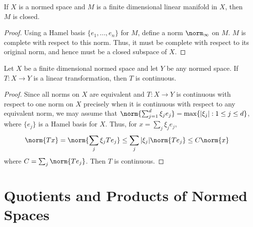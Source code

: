 \begin{prop}
    If $X$ is a normed space and $M$ is a finite dimensional linear manifold in $X$, then $M$ is closed.
\end{prop}
\begin{proof}
    Using a Hamel basis $\{e_1,...,e_n\}$ for $M$, define a norm $\norm_{\infty}$ on $M$. $M$ is complete with respect to this norm. Thus, it must be complete with respect to its original norm, and hence must be a closed subspace of $X$.
\end{proof}

\begin{prop}
    Let $X$ be a finite dimensional normed space and let $Y$ be any normed space. If $T:X\rightarrow Y$ is a linear transformation, then $T$ is continuous.
\end{prop}
\begin{proof}
    Since all norms on $X$ are equivalent and $T:X\rightarrow Y$ is continuous with respect to one norm on $X$ precisely when it is continuous with respect to any equivalent norm, we may assume that $\norm{\sum_{j=1}^d\xi_je_j} = \max\{|\xi_j|:1\leq j \leq d\}$, where $\{e_j\}$ is a Hamel basis for $X$. Thus, for $x = \sum_j\xi_je_j$, $$\norm{Tx} = \norm{\sum_j\xi_jTe_j} \leq \sum_j|\xi_j|\norm{Te_j} \leq C\norm{x}$$
    where $C = \sum_j\norm{Te_j}$. Then $T$ is continuous.
\end{proof}


\section{Quotients and Products of Normed Spaces}
\label{sec:quot}

